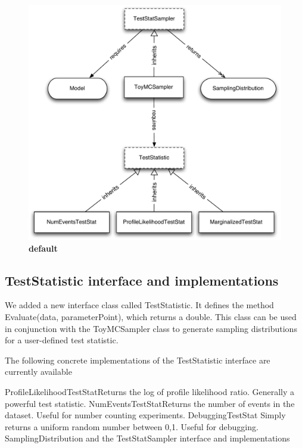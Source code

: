 \documentclass[11pt]{article}
\begin{document}
\begin{figure}[htbp]
\begin{center}
\includegraphics[width=\textwidth]{RooStats_TestStatistic.pdf}
\caption{{\bf default}}
\label{default}
\end{center}
\end{figure}

	\subsection{TestStatistic interface and implementations}


We added a new interface class called TestStatistic. It defines the method Evaluate(data, parameterPoint), which returns a double.  This class can be used in conjunction with the ToyMCSampler class to generate sampling distributions for a user-defined test statistic.  

The following concrete implementations of the TestStatistic interface are currently available

ProfileLikelihoodTestStatReturns the log of profile likelihood ratio.  Generally a powerful test statistic.
NumEventsTestStatReturns the number of events in the dataset.  Useful for number counting experiments.
DebuggingTestStat Simply returns a uniform random number between 0,1.  Useful for debugging.
SamplingDistribution and the TestStatSampler interface and implementations
\end{document}
